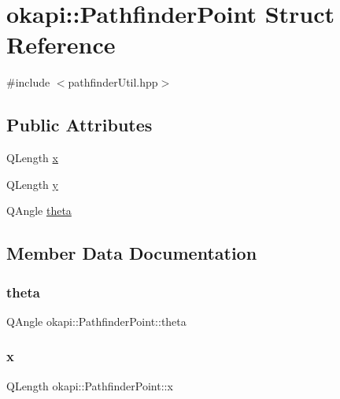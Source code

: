 \hypertarget{structokapi_1_1PathfinderPoint}{}\section{okapi\+::Pathfinder\+Point Struct Reference}
\label{structokapi_1_1PathfinderPoint}


{\ttfamily \#include $<$pathfinder\+Util.\+hpp$>$}

\subsection*{Public Attributes}
\begin{DoxyCompactItemize}
\item 
Q\+Length \mbox{\hyperlink{structokapi_1_1PathfinderPoint_a1f5e447cf4694b86d02d4242ee2d544d}{x}}
\item 
Q\+Length \mbox{\hyperlink{structokapi_1_1PathfinderPoint_ad6709f91b4117b390ce82247d35f70ca}{y}}
\item 
Q\+Angle \mbox{\hyperlink{structokapi_1_1PathfinderPoint_ae9329b225ce544bf342fc328d6c43cbe}{theta}}
\end{DoxyCompactItemize}


\subsection{Member Data Documentation}
\mbox{\label{structokapi_1_1PathfinderPoint_ae9329b225ce544bf342fc328d6c43cbe}} 
\subsubsection{\texorpdfstring{theta}{theta}}
{\footnotesize\ttfamily Q\+Angle okapi\+::\+Pathfinder\+Point\+::theta}

\mbox{\label{structokapi_1_1PathfinderPoint_a1f5e447cf4694b86d02d4242ee2d544d}} 
\subsubsection{\texorpdfstring{x}{x}}
{\footnotesize\ttfamily Q\+Length okapi\+::\+Pathfinder\+Point\+::x}

